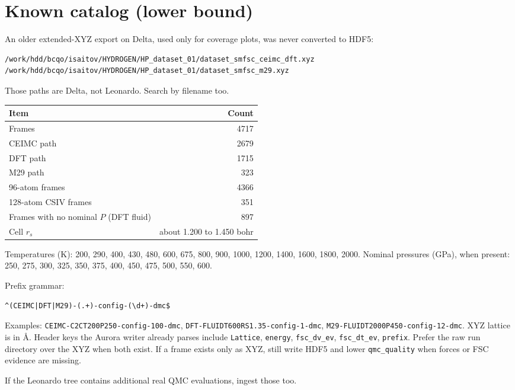 \documentclass[11pt]{article}
\begin{document}
\section{Known catalog (lower bound)}
An older extended-XYZ export on Delta, used only for coverage plots, was never
converted to HDF5:
\begin{verbatim}
/work/hdd/bcqo/isaitov/HYDROGEN/HP_dataset_01/dataset_smfsc_ceimc_dft.xyz
/work/hdd/bcqo/isaitov/HYDROGEN/HP_dataset_01/dataset_smfsc_m29.xyz
\end{verbatim}
Those paths are Delta, not Leonardo. Search by filename too.

\begin{center}
\begin{tabular}{lr}
\toprule
Item & Count \\
\midrule
Frames & 4717 \\
CEIMC path & 2679 \\
DFT path & 1715 \\
M29 path & 323 \\
96-atom frames & 4366 \\
128-atom CSIV frames & 351 \\
Frames with no nominal $P$ (DFT fluid) & 897 \\
Cell $r_s$ & about 1.200 to 1.450 bohr \\
\bottomrule
\end{tabular}
\end{center}

Temperatures (K): 200, 290, 400, 430, 480, 600, 675, 800, 900, 1000, 1200,
1400, 1600, 1800, 2000.
Nominal pressures (GPa), when present: 250, 275, 300, 325, 350, 375, 400,
450, 475, 500, 550, 600.

Prefix grammar:
\begin{verbatim}
^(CEIMC|DFT|M29)-(.+)-config-(\d+)-dmc$
\end{verbatim}
Examples: \texttt{CEIMC-C2CT200P250-config-100-dmc},
\texttt{DFT-FLUIDT600RS1.35-config-1-dmc},
\texttt{M29-FLUIDT2000P450-config-12-dmc}.
XYZ lattice is in \AA. Header keys the Aurora writer already parses include
\texttt{Lattice}, \texttt{energy}, \texttt{fsc\_dv\_ev}, \texttt{fsc\_dt\_ev},
\texttt{prefix}. Prefer the raw run directory over the XYZ when both exist.
If a frame exists only as XYZ, still write HDF5 and lower \texttt{qmc\_quality}
when forces or FSC evidence are missing.

If the Leonardo tree contains additional real QMC evaluations, ingest those too.
\end{document}
